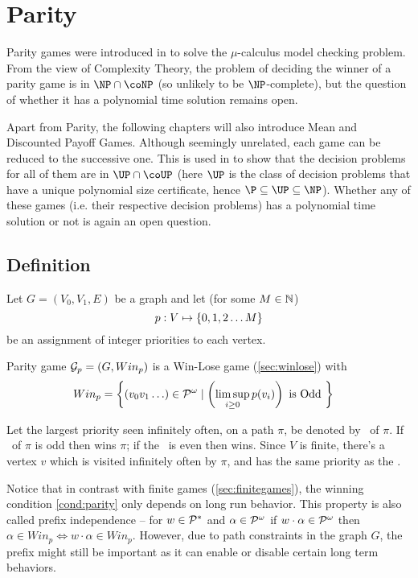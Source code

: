 \chapter{Parity}

Parity games were introduced in \cite{emersonjutla} to solve the $\mu$-calculus model checking problem. From the view of Complexity Theory, the problem of deciding the winner of a parity game is in $\NP \cap \coNP$ (so unlikely to be $\NP$-complete), but the question of whether it has a polynomial time solution remains open.

Apart from Parity, the following chapters will also introduce Mean and Discounted Payoff Games. Although seemingly unrelated, each game can be reduced to the successive one. This is used in \cite{parityup} to show that the decision problems for all of them are in $\UP \cap \coUP$ (here $\UP$ is the class of decision problems that have a unique polynomial size certificate, hence $\P \subseteq \UP \subseteq \NP$). Whether any of these games (i.e. their respective decision problems) has a polynomial time solution or not is again an open question.

\section{Definition}
Let $G=(V_0,V_1,E)$ be a graph and let (for some $M \in \mathbb{N}$)
\[
    p : V \mapsto \left\{0,1,2 \ldots M\right\}
\]
be an assignment of integer priorities to each vertex.

Parity game $\mathcal{G}_p=(G,Win_p)$ is a Win-Lose game (\autoref{sec:winlose}) with
\begin{align}
    Win_p &= \left\{ \left(v_0 v_1 \ldots\right) \in \mathcal{P}^\omega \mid \left(\limsup_{i \geq 0} p(v_i)\right)  \text{ is Odd }\right\} \label{cond:parity}
\end{align}

Let the largest priority seen infinitely often, on a path $\pi$, be denoted by \mip\ of $\pi$. If \mip\ of $\pi$ is odd then  wins $\pi$; if the \mip\ is even then  wins. Since $V$ is finite, there's a vertex $v$ which is visited infinitely often by $\pi$, and has the same priority as the \mip.

Notice that in contrast with finite games (\autoref{sec:finitegames}), the winning condition \eqref{cond:parity} only depends on long run behavior. This property is also called prefix independence -- for $w \in \mathcal{P}^{*}$ and $\alpha \in \mathcal{P}^\omega$ if $w \cdot \alpha \in \mathcal{P}^\omega$ then $\alpha \in Win_p \iff w \cdot \alpha \in Win_p$. However, due to path constraints in the graph $G$, the prefix might still be important as it can enable or disable certain long term behaviors.


